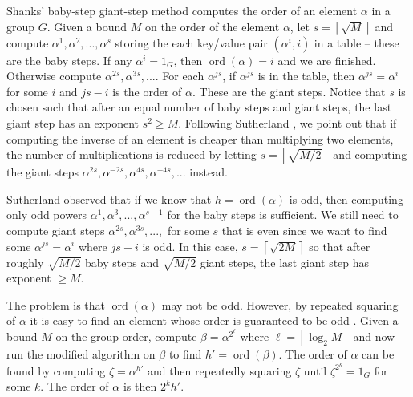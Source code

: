 \documentclass{ucalgthes1}
\theoremstyle{definition}
\DeclareMathOperator{\ord}{ord}
\newcommand{\floor}[1]{\left\lfloor #1 \right\rfloor}
\newcommand{\ceil}[1]{\left\lceil #1 \right\rceil}
\begin{document}
Shanks' baby-step giant-step method computes the order of an element $\alpha$ in a group $G$. Given a bound $M$ on the order of the element $\alpha$, let $s = \ceil{\sqrt{M}}$ and compute $\alpha^1, \alpha^2, ..., \alpha^s$ storing the each key/value pair $(\alpha^i, i)$ in a table -- these are the baby steps.  If any $\alpha^i = 1_G$, then $\ord(\alpha) = i$ and we are finished.  Otherwise compute $\alpha^{2s}, \alpha^{3s}, ...$.  For each $\alpha^{js}$, if $\alpha^{js}$ is in the table, then $\alpha^{js} = \alpha^i$ for some $i$ and $js - i$ is the order of $\alpha$.  These are the giant steps.  Notice that $s$ is chosen such that after an equal number of baby steps and giant steps, the last giant step has an exponent $s^2 \ge M$.  Following Sutherland \cite[p.50]{Sutherland2007}, we point out that if computing the inverse of an element is cheaper than multiplying two elements, the number of multiplications is reduced by letting $s = \ceil{\sqrt{M/2}}$ and computing the giant steps $\alpha^{2s}, \alpha^{-2s}, \alpha^{4s}, \alpha^{-4s}, ...$ instead.  




Sutherland observed \cite[p.56]{Sutherland2007} that if we know that $h = \ord(\alpha)$ is odd, then computing only odd powers $\alpha^1, \alpha^3, ..., \alpha^{s-1}$ for the baby steps is sufficient.  We still need to compute giant steps $\alpha^{2s}, \alpha^{3s}, ...,$ for some $s$ that is even since we want to find some $\alpha^{js} = \alpha^i$ where $js - i$ is odd.  In this case, $s = \ceil{\sqrt{2M}}$ so that after roughly $\sqrt{M/2}$ baby steps and $\sqrt{M/2}$ giant steps, the last giant step has exponent $\ge M$.

The problem is that $\ord(\alpha)$ may not be odd.  However, by repeated squaring of $\alpha$ it is easy to find an element whose order is guaranteed to be odd \cite[p.56]{Sutherland2007}.  Given a bound $M$ on the group order, compute $\beta = \alpha^{2^\ell}$ where $\ell = \floor{\log_2 M}$ and now run the modified algorithm on $\beta$ to find $h' = \ord(\beta)$.  The order of $\alpha$ can be found by computing $\zeta = \alpha^{h'}$ and then repeatedly squaring $\zeta$ until $\zeta^{2^k} = 1_G$ for some $k$.  The order of $\alpha$ is then $2^k h'$.
\end{document}
